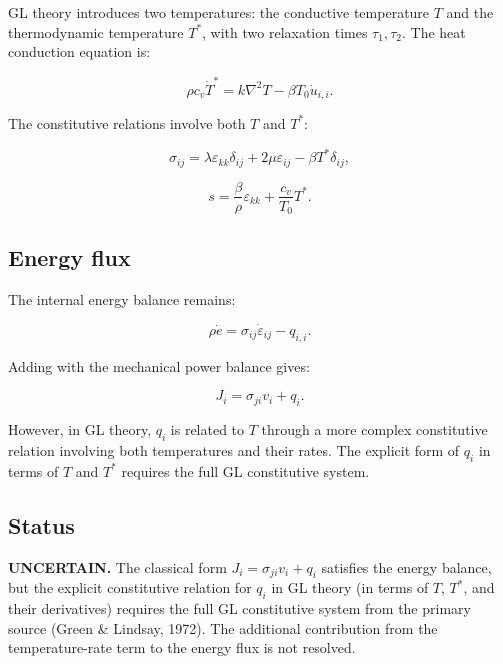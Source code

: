 GL theory introduces two temperatures: the conductive temperature $T$ and the thermodynamic temperature $T^*$, with two relaxation times $\tau_1, \tau_2$. The heat conduction equation is:

\begin{equation}
\rho c_v \dot{T}^* = k\nabla^2 T - \beta T_0 \dot{u}_{i,i}.
\label{ef:gl:1}
\end{equation}

The constitutive relations involve both $T$ and $T^*$:

\begin{equation}
\sigma_{ij} = \lambda\varepsilon_{kk}\delta_{ij} + 2\mu\varepsilon_{ij} - \beta T^*\delta_{ij},
\label{ef:gl:2}
\end{equation}

\begin{equation}
s = \frac{\beta}{\rho}\varepsilon_{kk} + \frac{c_v}{T_0}T^*.
\label{ef:gl:3}
\end{equation}

\subsection{Energy flux}

The internal energy balance remains:

\begin{equation}
\rho\dot{e} = \sigma_{ij}\dot{\varepsilon}_{ij} - q_{i,i}.
\label{ef:gl:4}
\end{equation}

Adding with the mechanical power balance gives:

\begin{equation}
J_i = \sigma_{ji}v_i + q_i.
\label{ef:gl:5}
\end{equation}

However, in GL theory, $q_i$ is related to $T$ through a more complex constitutive relation involving both temperatures and their rates. The explicit form of $q_i$ in terms of $T$ and $T^*$ requires the full GL constitutive system.

\subsection{Status}

\textbf{UNCERTAIN.} The classical form $J_i = \sigma_{ji}v_i + q_i$ satisfies the energy balance, but the explicit constitutive relation for $q_i$ in GL theory (in terms of $T$, $T^*$, and their derivatives) requires the full GL constitutive system from the primary source (Green \& Lindsay, 1972). The additional contribution from the temperature-rate term to the energy flux is not resolved.

